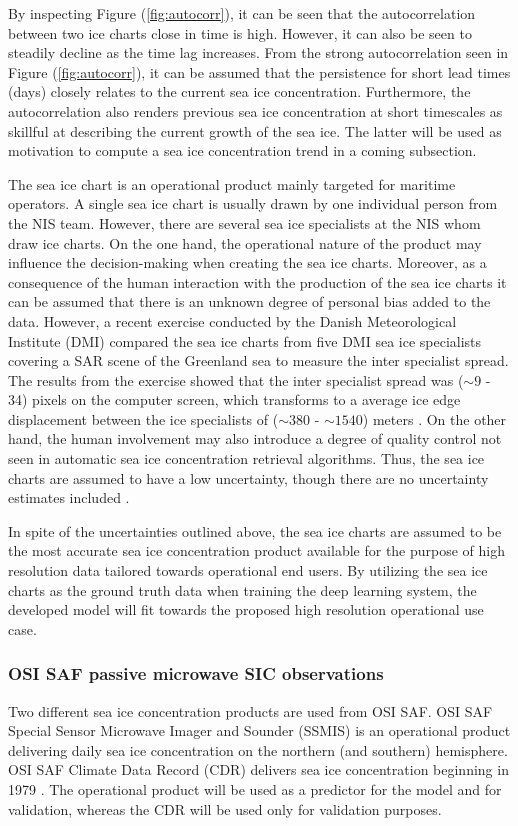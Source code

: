 \documentclass[../main/thesis.tex]{subfiles}
\begin{document}
By inspecting Figure (\ref{fig:autocorr}), it can be seen that the autocorrelation between two ice charts close in time is high. However, it can also be seen to steadily decline as the time lag increases. From the strong autocorrelation seen in Figure (\ref{fig:autocorr}), it can be assumed that the persistence for short lead times (days) closely relates to the current sea ice concentration. Furthermore, the autocorrelation also renders previous sea ice concentration at short timescales as skillful at describing the current growth of the sea ice. The latter will be used as motivation to compute a sea ice concentration trend in a coming subsection.

The sea ice chart is an operational product mainly targeted for maritime operators. A single sea ice chart is usually drawn by one individual person from the NIS team. However, there are several sea ice specialists at the NIS whom draw ice charts. On the one hand, the operational nature of the product may influence the decision-making when creating the sea ice charts. Moreover, as a consequence of the human interaction with the production of the sea ice charts it can be assumed that there is an unknown degree of personal bias added to the data. However, a recent exercise conducted by the Danish Meteorological Institute (DMI) compared the sea ice charts from five DMI sea ice specialists covering a SAR scene of the Greenland sea to measure the inter specialist spread. The results from the exercise showed that the inter specialist spread was ($\sim9$ - 34) pixels on the computer screen, which transforms to a average ice edge displacement between the ice specialists of ($\sim380$ - $\sim1540$) meters \citep{Kreiner2023}. On the other hand, the human involvement may also introduce a degree of quality control not seen in automatic sea ice concentration retrieval algorithms. Thus, the sea ice charts are assumed to have a low uncertainty, though there are no uncertainty estimates included \citep{Dinessen2020}.

In spite of the uncertainties outlined above, the sea ice charts are assumed to be the most accurate sea ice concentration product available for the purpose of high resolution data tailored towards operational end users. By utilizing the sea ice charts as the ground truth data when training the deep learning system, the developed model will fit towards the proposed high resolution operational use case.

\subsubsection{OSI SAF passive microwave SIC observations}
\label{sec:osisaf}
Two different sea ice concentration products are used from OSI SAF. OSI SAF Special Sensor Microwave Imager and Sounder (SSMIS) is an operational product delivering daily sea ice concentration on the northern (and southern) hemisphere. OSI SAF Climate Data Record (CDR) \citep{Soerensen2021} delivers sea ice concentration beginning in 1979 \citep{Lavergne2019}. The operational product will be used as a predictor for the model and for validation, whereas the CDR will be used only for validation purposes.
\end{document}
